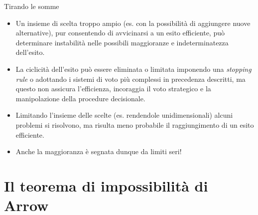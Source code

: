 \documentclass[11pt]{beamer}
\begin{document}
\begin{frame}{Tirando le somme}
\begin{itemize}
\item Un insieme di scelta troppo ampio (es. con la possibilità di aggiungere
nuove alternative), pur consentendo di avvicinarsi a un esito efficiente,
può determinare instabilità nelle possibili maggioranze e indeterminatezza
dell'esito.
\item La ciclicità dell'esito può essere eliminata o limitata imponendo una
\emph{stopping rule} o adottando i sistemi di voto più complessi in precedenza
descritti, ma questo non assicura l'efficienza, incoraggia il voto
strategico e la manipolazione della procedure decisionale.
\item Limitando l'insieme delle scelte (es. rendendole unidimensionali) alcuni
problemi si risolvono, ma risulta meno probabile il raggiungimento di un
esito efficiente.
\item Anche la maggioranza è segnata dunque da limiti seri!
\end{itemize}
\end{frame}

\section{Il teorema di impossibilità di Arrow}
\end{document}
